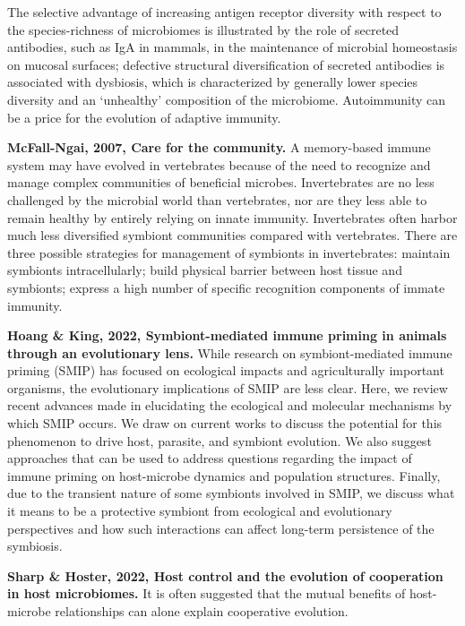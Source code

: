 \documentclass[11pt]{article}
\begin{document}
\begin{sloppypar}
The selective advantage of increasing antigen receptor diversity with respect to the species-richness of microbiomes is illustrated by the role of secreted antibodies, such as IgA in mammals, in the maintenance of microbial homeostasis on mucosal surfaces; defective structural diversification of secreted antibodies is associated with dysbiosis, which is characterized by generally lower species diversity and an ‘unhealthy’ composition of the microbiome. 
Autoimmunity can be a price for the evolution of adaptive immunity. 
\par
\textbf{McFall-Ngai, 2007, Care for the community.} \newline
A memory-based immune system may have evolved in vertebrates because of the need to recognize and manage complex communities of beneficial microbes. 
Invertebrates are no less challenged by the microbial world than vertebrates, nor are they less able to remain healthy by entirely relying on innate immunity. 
Invertebrates often harbor much less diversified symbiont communities compared with vertebrates. 
There are three possible strategies for management of symbionts in invertebrates: 
maintain symbionts intracellularly; 
build physical barrier between host tissue and symbionts; 
express a high number of specific recognition components of immate immunity. 
\par
\textbf{Hoang & King, 2022, Symbiont-mediated immune priming in animals through an evolutionary lens.} \newline
While research on symbiont-mediated immune priming (SMIP) has focused on ecological impacts and agriculturally important organisms, the evolutionary implications of SMIP are less clear. 
Here, we review recent advances made in elucidating the ecological and molecular mechanisms by which SMIP occurs. 
We draw on current works to discuss the potential for this phenomenon to drive host, parasite, and symbiont evolution. 
We also suggest approaches that can be used to address questions regarding the impact of immune priming on host-microbe dynamics and population structures. 
Finally, due to the transient nature of some symbionts involved in SMIP, we discuss what it means to be a protective symbiont from ecological and evolutionary perspectives and how such interactions can affect long-term persistence of the symbiosis. 
\par
\textbf{Sharp & Hoster, 2022, Host control and the evolution of cooperation in host microbiomes.} \newline
It is often suggested that the mutual benefits of host-microbe relationships can alone explain cooperative evolution. 

\end{sloppypar}
\end{document}
